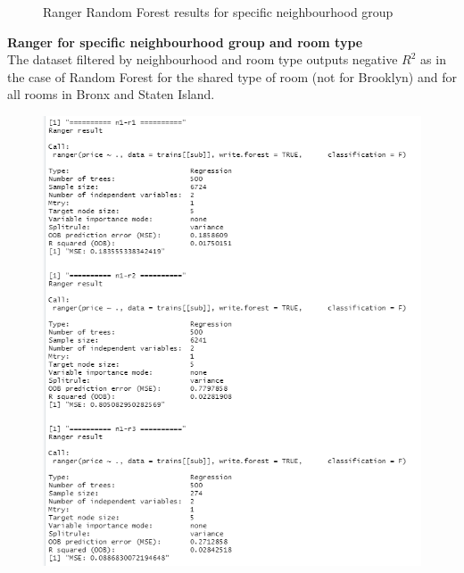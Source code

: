 \documentclass{FR16}
\begin{document}
\begin{figure}[!htb]
\begin{minipage}{0.48\textwidth}
   \end{minipage}
        \caption{Ranger Random Forest results for specific neighbourhood group}\label{fig:17}

\end{figure}
\noindent \textbf{Ranger for specific neighbourhood group and room type}\\
The dataset filtered by neighbourhood and room type outputs negative $R^2$ as in the case of Random Forest for the shared type of room (not for Brooklyn) and for all rooms in Bronx and Staten Island.
\begin{figure}[!htb]
   \begin{minipage}{0.48\textwidth}
     \centering
     \includegraphics[width=1\linewidth]{figures/rgn2.1.png} 
   \end{minipage}\hfill
   \begin{minipage}{0.48\textwidth}
     \centering

\end{minipage}
\end{figure}
\end{document}
